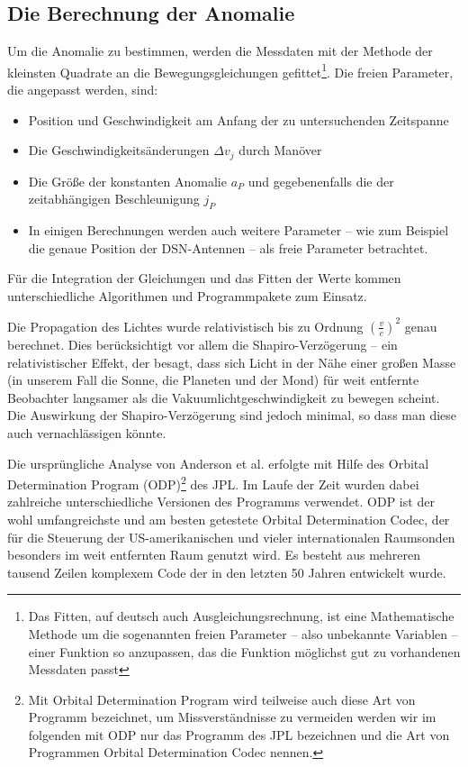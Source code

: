 \subsection{Die Berechnung der Anomalie}
Um die Anomalie zu bestimmen, werden die Messdaten mit der Methode der kleinsten Quadrate an die Bewegungsgleichungen gefittet\footnote{Das Fitten, auf deutsch auch Ausgleichungsrechnung, ist eine Mathematische Methode um die sogenannten freien Parameter – also unbekannte Variablen – einer Funktion so anzupassen, das die Funktion möglichst gut zu vorhandenen Messdaten passt}. Die freien Parameter, die angepasst werden, sind:
\begin{itemize}
\item Position und Geschwindigkeit am Anfang der zu untersuchenden Zeitspanne
\item Die Geschwindigkeitsänderungen $\Delta v_j$ durch Manöver
\item Die Größe der konstanten Anomalie $a_P$ und gegebenenfalls die der zeitabhängigen Beschleunigung $j_P$
\item In einigen Berechnungen werden auch weitere Parameter – wie zum Beispiel die genaue Position der DSN-Antennen – als freie Parameter betrachtet.
\end{itemize}
Für die Integration der Gleichungen und das Fitten der Werte kommen unterschiedliche Algorithmen und Programmpakete zum Einsatz.

Die Propagation des Lichtes wurde relativistisch bis zu Ordnung $(\frac{v}{c})^2$ genau berechnet.
Dies berücksichtigt vor allem die Shapiro-Verzögerung – ein relativistischer Effekt, der besagt,
dass sich Licht in der Nähe einer großen Masse (in unserem Fall die Sonne, die Planeten und der Mond) für weit entfernte Beobachter langsamer als die Vakuumlichtgeschwindigkeit zu bewegen scheint. %
Die Auswirkung der Shapiro-Verzögerung sind jedoch minimal\cite{Levy2008}, so dass man diese auch vernachlässigen könnte.

Die ursprüngliche Analyse von Anderson et al. erfolgte mit Hilfe des Orbital Determination Program (ODP)\footnote{Mit Orbital Determination Program wird teilweise auch diese Art von Programm bezeichnet, um Missverständnisse zu vermeiden werden wir im folgenden mit ODP nur das Programm des JPL bezeichnen und die Art von Programmen Orbital Determination Codec nennen.} des JPL. Im Laufe der Zeit wurden dabei zahlreiche unterschiedliche Versionen des Programms verwendet. ODP ist der wohl umfangreichste und am besten getestete Orbital Determination Codec, der für die Steuerung der US-amerikanischen und vieler internationalen Raumsonden besonders im weit entfernten Raum genutzt wird. Es besteht aus mehreren tausend Zeilen komplexem Code der in den letzten 50 Jahren entwickelt wurde.\cite{Turyshev2010}

